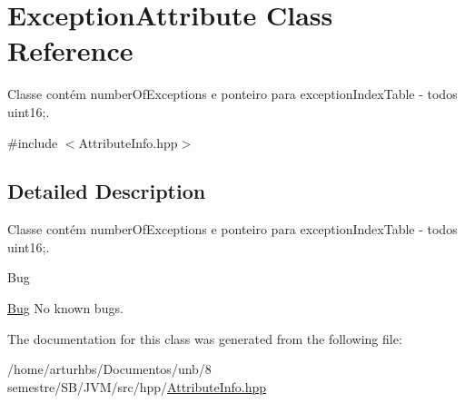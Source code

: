 \hypertarget{classExceptionAttribute}{}\section{Exception\+Attribute Class Reference}
\label{classExceptionAttribute}


Classe contém number\+Of\+Exceptions e ponteiro para exception\+Index\+Table -\/ todos uint16;.  




{\ttfamily \#include $<$Attribute\+Info.\+hpp$>$}



\subsection{Detailed Description}
Classe contém number\+Of\+Exceptions e ponteiro para exception\+Index\+Table -\/ todos uint16;. 

\begin{DoxyRefDesc}{Bug}
\item[\hyperlink{bug__bug000005}{Bug}]No known bugs. \end{DoxyRefDesc}


The documentation for this class was generated from the following file\+:\begin{DoxyCompactItemize}
\item 
/home/arturhbs/\+Documentos/unb/8 semestre/\+S\+B/\+J\+V\+M/src/hpp/\hyperlink{AttributeInfo_8hpp}{Attribute\+Info.\+hpp}\end{DoxyCompactItemize}
